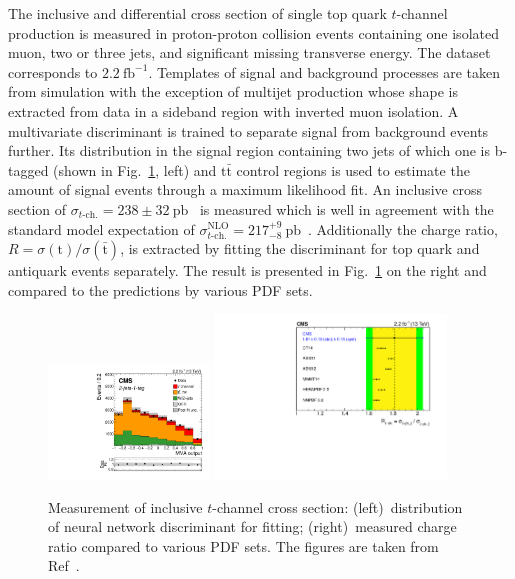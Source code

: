 \documentclass[12pt]{article}
\begin{document}
The inclusive and differential cross section of single top quark $t$-channel production is measured in proton-proton collision events containing one isolated muon, two or three jets, and significant missing transverse energy. The dataset corresponds to $2.2~\mathrm{fb}^{-1}$. Templates of signal and background processes are taken from simulation with the exception of multijet production whose shape is extracted from data in a sideband region with inverted muon isolation. A multivariate discriminant is trained to separate signal from background events further. Its distribution in the signal region containing two jets of which one is b-tagged (shown in Fig.~\ref{fig:t-channel}, left) and $\mathrm{t}\bar{\mathrm{t}}$ control regions is used to estimate the amount of signal events through a maximum likelihood fit. An inclusive cross section of $\sigma_{t\mathrm{\mbox{-}ch.}}=238\pm32~\mathrm{pb}$~\cite{tchannel-inc} is measured which is well in agreement with the standard model expectation of $\sigma_{t\mathrm{\mbox{-}ch.}}^\mathrm{NLO}=217^{+9}_{-8}~\mathrm{pb}$~\cite{hathor}. Additionally the charge ratio, $R=\sigma(\mathrm{t})/\sigma(\bar{\mathrm{t}})$, is extracted by fitting the discriminant for top quark and antiquark events separately. The result is presented in Fig.~\ref{fig:t-channel} on the right and compared to the predictions by various PDF sets.


\begin{figure}[!htb]
\begin{center}
\includegraphics[width=0.38\textwidth]{tch-nn.pdf}\hspace{0.02\textwidth}
\includegraphics[width=0.55\textwidth]{tch-ratio.pdf}
\caption{\label{fig:t-channel}Measurement of inclusive $t$-channel cross section: (left)~distribution of neural network discriminant for fitting; (right)~measured charge ratio compared to various PDF sets. The figures are taken from Ref~\cite{tchannel-inc}.}
\end{center}
\end{figure}
\end{document}
